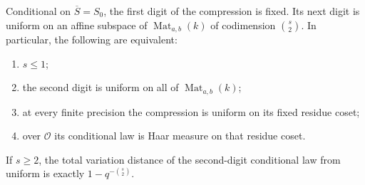 \begin{theorem}
\label{thm:padic-tangent}
Conditional on $\overline S=S_0$, the first digit of the compression
is fixed. Its next digit is uniform on an affine subspace of
$\operatorname{Mat}_{a,b}(k)$ of codimension $\binom{s}{2}$.
In particular, the following are equivalent:
\begin{enumerate}
\item $s\leq1$;
\item the second digit is uniform on all of
$\operatorname{Mat}_{a,b}(k)$;
\item at every finite precision the compression is uniform on its
fixed residue coset;
\item over $\mathcal O$ its conditional law is Haar measure on that
residue coset.
\end{enumerate}
If $s\geq2$, the total variation distance of the second-digit
conditional law from uniform is exactly $1-q^{-\binom{s}{2}}$.
\end{theorem}

